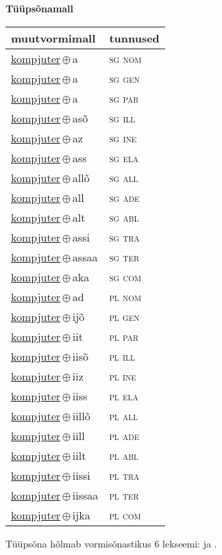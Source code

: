 

\vspace{3.5em}
\noindent \begin{minipage}{\textwidth}
\noindent \textbf{Tüüpsõnamall \,}\\

\begin{sideways}
\begin{tabular}{l l}
muutvormimall & tunnused \\
\hline
\underline{kompjuter}\,$\oplus$\,a & \textsc{ sg nom } \\
\underline{kompjuter}\,$\oplus$\,a & \textsc{ sg gen } \\
\underline{kompjuter}\,$\oplus$\,a & \textsc{ sg par } \\
\underline{kompjuter}\,$\oplus$\,asõ & \textsc{ sg ill } \\
\underline{kompjuter}\,$\oplus$\,az & \textsc{ sg ine } \\
\underline{kompjuter}\,$\oplus$\,ass & \textsc{ sg ela } \\
\underline{kompjuter}\,$\oplus$\,allõ & \textsc{ sg all } \\
\underline{kompjuter}\,$\oplus$\,all & \textsc{ sg ade } \\
\underline{kompjuter}\,$\oplus$\,alt & \textsc{ sg abl } \\
\underline{kompjuter}\,$\oplus$\,assi & \textsc{ sg tra } \\
\underline{kompjuter}\,$\oplus$\,assaa & \textsc{ sg ter } \\
\underline{kompjuter}\,$\oplus$\,aka & \textsc{ sg com } \\
\underline{kompjuter}\,$\oplus$\,ad & \textsc{ pl nom } \\
\underline{kompjuter}\,$\oplus$\,ijõ & \textsc{ pl gen } \\
\underline{kompjuter}\,$\oplus$\,iit & \textsc{ pl par } \\
\underline{kompjuter}\,$\oplus$\,iisõ & \textsc{ pl ill } \\
\underline{kompjuter}\,$\oplus$\,iiz & \textsc{ pl ine } \\
\underline{kompjuter}\,$\oplus$\,iiss & \textsc{ pl ela } \\
\underline{kompjuter}\,$\oplus$\,iillõ & \textsc{ pl all } \\
\underline{kompjuter}\,$\oplus$\,iill & \textsc{ pl ade } \\
\underline{kompjuter}\,$\oplus$\,iilt & \textsc{ pl abl } \\
\underline{kompjuter}\,$\oplus$\,iissi & \textsc{ pl tra } \\
\underline{kompjuter}\,$\oplus$\,iissaa & \textsc{ pl ter } \\
\underline{kompjuter}\,$\oplus$\,ijka & \textsc{ pl com } \\
\end{tabular}
\end{sideways}
\label{tab:tüüpsõnamall-kompjutera}

\end{minipage}

 
\vspace{1em}
\noindent Tüüpsõna hõlmab vormisõnastikus 6 lekseemi:  ja .
